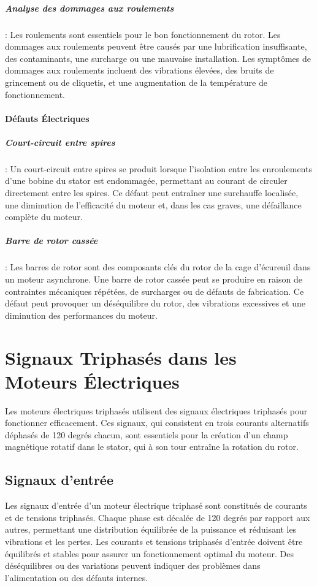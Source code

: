 \subparagraph{Analyse des dommages aux roulements}:
Les roulements sont essentiels pour le bon fonctionnement du rotor. Les
dommages aux roulements peuvent être causés par une lubrification insuffisante,
des contaminants, une surcharge ou une mauvaise installation. Les symptômes de
dommages aux roulements incluent des vibrations élevées, des bruits de
grincement ou de cliquetis, et une augmentation de la température de
fonctionnement.

\paragraph{Défauts Électriques}

\subparagraph{Court-circuit entre spires}:
Un court-circuit entre spires se produit lorsque l'isolation entre les
enroulements d'une bobine du stator est endommagée, permettant au courant de
circuler directement entre les spires. Ce défaut peut entraîner une surchauffe
localisée, une diminution de l'efficacité du moteur et, dans les cas graves,
une défaillance complète du moteur.

\subparagraph{Barre de rotor cassée}:
Les barres de rotor sont des composants clés du rotor de la cage d'écureuil
dans un moteur asynchrone. Une barre de rotor cassée peut se produire en raison
de contraintes mécaniques répétées, de surcharges ou de défauts de fabrication.
Ce défaut peut provoquer un déséquilibre du rotor, des vibrations excessives et
une diminution des performances du moteur.

\section*{Signaux Triphasés dans les Moteurs Électriques}

Les moteurs électriques triphasés utilisent des signaux électriques triphasés
pour fonctionner efficacement. Ces signaux, qui consistent en trois courants
alternatifs déphasés de 120 degrés chacun, sont essentiels pour la création
d'un champ magnétique rotatif dans le stator, qui à son tour entraîne la
rotation du rotor.

\subsection*{Signaux d'entrée}

Les signaux d'entrée d'un moteur électrique triphasé sont constitués de
courants et de tensions triphasés. Chaque phase est décalée de 120 degrés par
rapport aux autres, permettant une distribution équilibrée de la puissance et
réduisant les vibrations et les pertes. Les courants et tensions triphasés
d'entrée doivent être équilibrés et stables pour assurer un fonctionnement
optimal du moteur. Des déséquilibres ou des variations peuvent indiquer des
problèmes dans l'alimentation ou des défauts internes.

